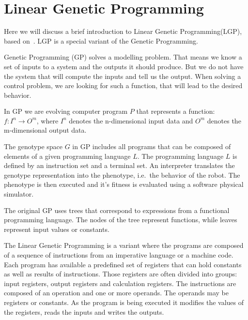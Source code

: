 \documentclass{ExcelAtFIT}
\begin{document}
\section{Linear Genetic Programming}
\label{sec:theory}
Here we will discuss a brief introduction to Linear Genetic Programming(LGP), based on~\cite{Brameier2010}.
LGP is a special variant of the Genetic Programming.

Genetic Programming (GP) solves a modelling problem.
That means we know a set of inputs to a system and the outputs it should produce.
But we do not have the system that will compute the inputs and tell us the output.
When solving a control problem, we are looking for such a function, that will lead to the desired behavior.

In GP we are evolving computer program $P$ that represents a function: $f : I^n \to O^m$, where $I^n$ denotes the n-dimensional input data and $O^m$ denotes the m-dimensional output data.

The genotype space $G$ in GP includes all programs that can be composed of elements of a given programming language $L$.
The programming language $L$ is defined by an instruction set and a terminal set.
An interpreter translates the genotype representation into the phenotype, i.e.\ the behavior of the robot.
The phenotype is then executed and it's fitness is evaluated using a software physical simulator.

The original GP uses trees that correspond to expressions from a functional programming language.
The nodes of the tree represent functions, while leaves represent input values or constants.

The Linear Genetic Programming is a variant where the programs are composed of a sequence of instructions from an imperative language or a machine code.
Each program has available a predefined set of registers that can hold constants as well as results of instructions.
Those registers are often divided into groups: input registers, output registers and calculation registers.
The instructions are composed of an operation and one or more operands.
The operands may be registers or constants.
As the program is being executed it modifies the values of the registers, reads the inputs and writes the outputs.
\end{document}
